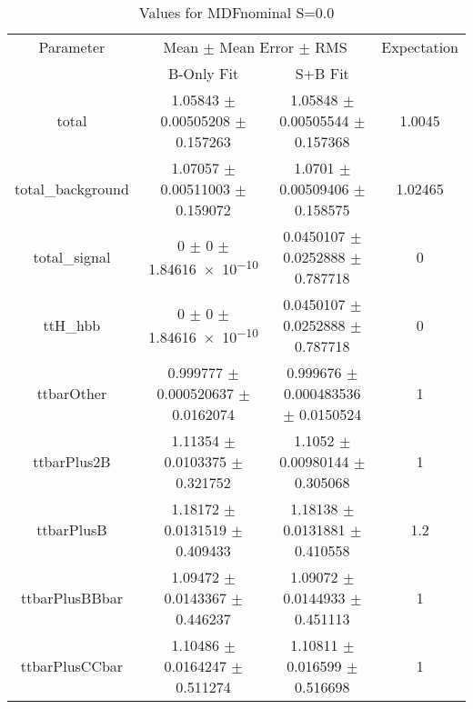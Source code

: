 \begin{table}
\centering
\caption{Values for MDFnominal S=0.0}
\begin{tabular}{cccc}
\toprule
Parameter & \multicolumn{2}{c}{Mean $\pm$ Mean Error $\pm$ RMS} & Expectation\\
 & B-Only Fit & S+B Fit & \\
\midrule
total & \num{1.05843} $\pm$ \num{0.00505208} $\pm$ \num{0.157263} & \num{1.05848} $\pm$ \num{0.00505544} $\pm$ \num{0.157368} & \num{1.0045}\\
total\_background & \num{1.07057} $\pm$ \num{0.00511003} $\pm$ \num{0.159072} & \num{1.0701} $\pm$ \num{0.00509406} $\pm$ \num{0.158575} & \num{1.02465}\\
total\_signal & \num{0} $\pm$ \num{0} $\pm$ \num{1.84616e-10} & \num{0.0450107} $\pm$ \num{0.0252888} $\pm$ \num{0.787718} & \num{0}\\
ttH\_hbb & \num{0} $\pm$ \num{0} $\pm$ \num{1.84616e-10} & \num{0.0450107} $\pm$ \num{0.0252888} $\pm$ \num{0.787718} & \num{0}\\
ttbarOther & \num{0.999777} $\pm$ \num{0.000520637} $\pm$ \num{0.0162074} & \num{0.999676} $\pm$ \num{0.000483536} $\pm$ \num{0.0150524} & \num{1}\\
ttbarPlus2B & \num{1.11354} $\pm$ \num{0.0103375} $\pm$ \num{0.321752} & \num{1.1052} $\pm$ \num{0.00980144} $\pm$ \num{0.305068} & \num{1}\\
ttbarPlusB & \num{1.18172} $\pm$ \num{0.0131519} $\pm$ \num{0.409433} & \num{1.18138} $\pm$ \num{0.0131881} $\pm$ \num{0.410558} & \num{1.2}\\
ttbarPlusBBbar & \num{1.09472} $\pm$ \num{0.0143367} $\pm$ \num{0.446237} & \num{1.09072} $\pm$ \num{0.0144933} $\pm$ \num{0.451113} & \num{1}\\
ttbarPlusCCbar & \num{1.10486} $\pm$ \num{0.0164247} $\pm$ \num{0.511274} & \num{1.10811} $\pm$ \num{0.016599} $\pm$ \num{0.516698} & \num{1}\\
\bottomrule
\end{tabular}
\end{table}